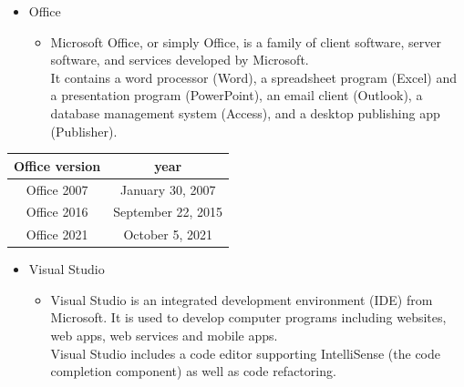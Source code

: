 \documentclass[a4paper,11pt]{report}
\begin{document}
\clearpage
\begin{itemize}
    \item Office
    \begin{itemize}
         \item Microsoft Office, or simply Office, is a family of client software, server software, and services developed by Microsoft.\\
         It contains a word processor (Word), a spreadsheet program (Excel) and a presentation program (PowerPoint), an email client (Outlook), a database management system (Access), and a desktop publishing app (Publisher).
\end{itemize}
\end{itemize}
\begin{center}
\begin{tabular}{|c|c|}

\hline
  Office version   & year \\
     \hline
   Office 2007  &  January 30, 2007\\
     \hline
    Office 2016 & September 22, 2015  \\
     \hline
   Office 2021 & October 5, 2021 \\
   \hline
\end{tabular}
\end{center}
\begin{itemize}
    \item Visual Studio
    \begin{itemize}
        \item Visual Studio is an integrated development environment (IDE) from Microsoft. It is used to develop computer programs including websites, web apps, web services and mobile apps.\\
        Visual Studio includes a code editor supporting IntelliSense (the code completion component) as well as code refactoring.
\end{itemize}
\end{itemize}
\end{document}
